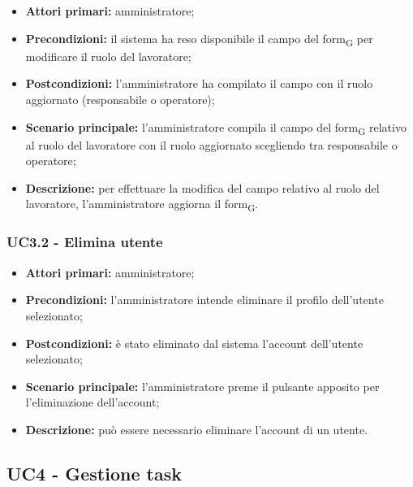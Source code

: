 \begin{itemize}
	\item 	\textbf{Attori primari:} amministratore;
	\item 	\textbf{Precondizioni:} il sistema ha reso disponibile il campo del form\textsubscript{G} per modificare il ruolo del lavoratore;
	\item 	\textbf{Postcondizioni:} l'amministratore ha compilato il campo con il ruolo aggiornato (responsabile o operatore);
	\item 	\textbf{Scenario principale:} l'amministratore compila il campo del form\textsubscript{G} relativo al ruolo del lavoratore con il ruolo aggiornato scegliendo tra responsabile o operatore;
	\item 	\textbf{Descrizione:} per effettuare la modifica del campo relativo al ruolo del lavoratore, l'amministratore aggiorna il form\textsubscript{G}.

\end{itemize}

\subsubsection{UC3.2 - Elimina utente}

\begin{itemize}
	\item 	\textbf{Attori primari:} amministratore;
	\item 	\textbf{Precondizioni:} l'amministratore intende eliminare il profilo dell'utente selezionato;
	\item 	\textbf{Postcondizioni:} è stato eliminato dal sistema l'account dell'utente selezionato;
	\item 	\textbf{Scenario principale:} l'amministratore preme il pulsante apposito per l'eliminazione dell'account;
	\item 	\textbf{Descrizione:} può essere necessario eliminare l'account di un utente.
\end{itemize}

\subsection{UC4 - Gestione task}

